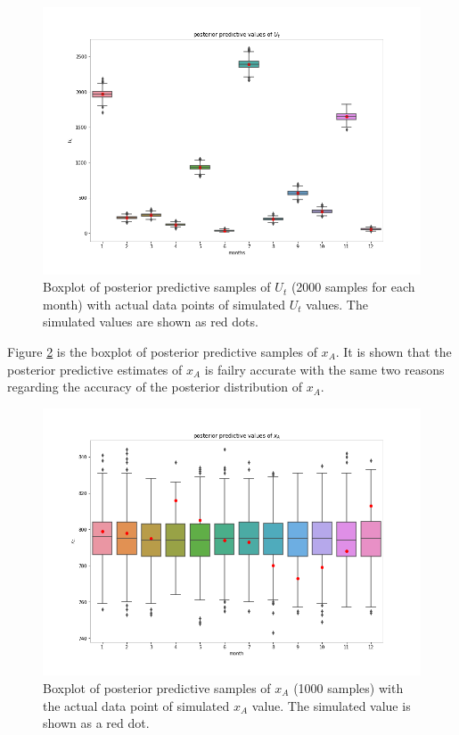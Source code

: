 \documentclass[
10pt, %
a4paper, %
oneside, %
headinclude,footinclude, %
BCOR5mm, %
]{scrartcl}
\begin{document}
\begin{figure}[htb]
	\centering
	\includegraphics[width=1\linewidth]{Figures/early_r_ppc1_ut.png}
	\caption{Boxplot of posterior predictive samples of $U_t$ (2000 samples for each month) with actual data points of simulated $U_t$ values. The simulated values are shown as red dots.}
	\label{ppc_ut}
\end{figure}

Figure \ref{ppc_xt} is the boxplot of posterior predictive samples of $x_A$. It is shown that the posterior predictive estimates of $x_A$ is failry accurate with the same two reasons regarding the accuracy of the posterior distribution of $x_A$.\\
 
\begin{figure}[htb]
	\centering
	\includegraphics[width=1\linewidth]{Figures/early_r_ppc1_xt.png}
	\caption{Boxplot of posterior predictive samples of $x_A$ (1000 samples) with the actual data point of simulated $x_A$ value. The simulated value is shown as a red dot.}
	\label{ppc_xt}
\end{figure}
\end{document}

